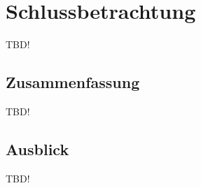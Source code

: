 \chapter{Schlussbetrachtung }
\label{chapter:schlussbetrachtung}


TBD!


\section{Zusammenfassung}
\label{section:zusammenfassung}

TBD!

\section{Ausblick}
\label{section:ausblick}

TBD!
